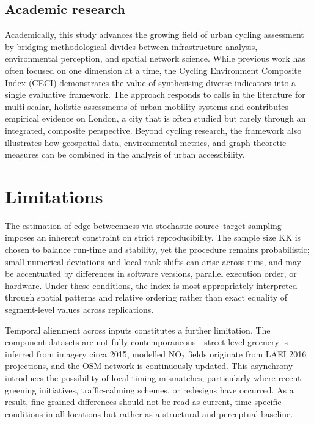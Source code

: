 \documentclass[
  12pt,
  oneside]{book}
\begin{document}
\subsection{Academic research}\label{academic-research}

Academically, this study advances the growing field of urban cycling assessment by bridging methodological divides between infrastructure analysis, environmental perception, and spatial network science. While previous work has often focused on one dimension at a time, the Cycling Environment Composite Index (CECI) demonstrates the value of synthesising diverse indicators into a single evaluative framework. The approach responds to calls in the literature for multi-scalar, holistic assessments of urban mobility systems and contributes empirical evidence on London, a city that is often studied but rarely through an integrated, composite perspective. Beyond cycling research, the framework also illustrates how geospatial data, environmental metrics, and graph-theoretic measures can be combined in the analysis of urban accessibility.

\section{Limitations}\label{limitations}

The estimation of edge betweenness via stochastic source--target sampling imposes an inherent constraint on strict reproducibility. The sample size KK is chosen to balance run-time and stability, yet the procedure remains probabilistic; small numerical deviations and local rank shifts can arise across runs, and may be accentuated by differences in software versions, parallel execution order, or hardware. Under these conditions, the index is most appropriately interpreted through spatial patterns and relative ordering rather than exact equality of segment-level values across replications.

Temporal alignment across inputs constitutes a further limitation. The component datasets are not fully contemporaneous---street-level greenery is inferred from imagery circa 2015, modelled NO\(_2\) fields originate from LAEI 2016 projections, and the OSM network is continuously updated. This asynchrony introduces the possibility of local timing mismatches, particularly where recent greening initiatives, traffic-calming schemes, or redesigns have occurred. As a result, fine-grained differences should not be read as current, time-specific conditions in all locations but rather as a structural and perceptual baseline.
\end{document}
